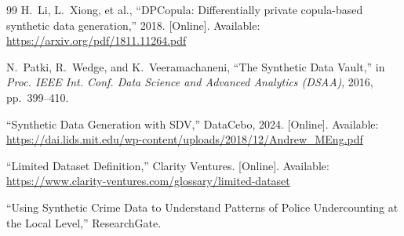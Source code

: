 \documentclass[conference]{IEEEtran}
\begin{document}
\begin{thebibliography}{99}
H.~Li, L.~Xiong, et al., ``DPCopula: Differentially private copula-based synthetic data generation,'' 2018. [Online]. Available: \url{https://arxiv.org/pdf/1811.11264.pdf}

N.~Patki, R.~Wedge, and K.~Veeramachaneni, ``The Synthetic Data Vault,'' in \emph{Proc. IEEE Int. Conf. Data Science and Advanced Analytics (DSAA)}, 2016, pp.~399--410.

``Synthetic Data Generation with SDV,'' DataCebo, 2024. [Online]. Available: \url{https://dai.lids.mit.edu/wp-content/uploads/2018/12/Andrew_MEng.pdf}

``Limited Dataset Definition,'' Clarity Ventures. [Online]. Available: \url{https://www.clarity-ventures.com/glossary/limited-dataset}

``Using Synthetic Crime Data to Understand Patterns of Police Undercounting at the Local Level,'' ResearchGate.

\end{thebibliography}
\end{document}

